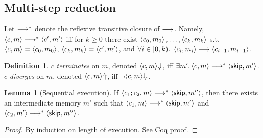 \documentclass[10pt]{article}
\theoremstyle{definition}
\newtheorem{definition}{Definition}
\newtheorem{lemma}{Lemma}
\begin{document}

%



\subsection*{Multi-step reduction}

Let $\mathrel{\mathrel{\longrightarrow}^{\ast}}$ denote the reflexive transitive closure of $\mathrel{\longrightarrow}$. Namely,
$\Cfg(c,m) \sstepstotrans \Cfg(c',m')$ iff
for $k\geq 0$ there exist
$\Cfg(c_0,m_0),\dots,\Cfg(c_k,m_k)$
s.t.\ $\Cfg(c,m)=\Cfg(c_0,m_0)$,
$\Cfg(c_k,m_k)=\Cfg(c',m')$,
and $\forall i \in [0,k).\ \Cfg(c_i,m_i) \sstepsto \Cfg(c_{i+1},m_{i+1})$.

\begin{definition}
    $c$ \emph{terminates} on $m$, denoted $\Terminate(c,m)$,
    iff $\exists m'. \Cfg(c,m) \sstepstotrans \Cfg(\Skip,m')$.
    $c$ \emph{diverges} on $m$, denoted $\Diverge(c,m)$,
    iff $\neg \Terminate(c,m)$.
\end{definition}

\begin{lemma}[Sequential execution]
    If $\Cfg(c_1; c_2, m) \sstepstotrans \Cfg(\Skip, m'')$, 
    then there exists an intermediate memory $m'$ such that
    $\Cfg(c_1, m) \sstepstotrans \Cfg(\Skip, m')$
    and $\Cfg(c_2, m') \sstepstotrans \Cfg(\Skip, m'')$.
\end{lemma}
\begin{proof}
    By induction on length of execution. See Coq proof.
\end{proof}

\end{document}

